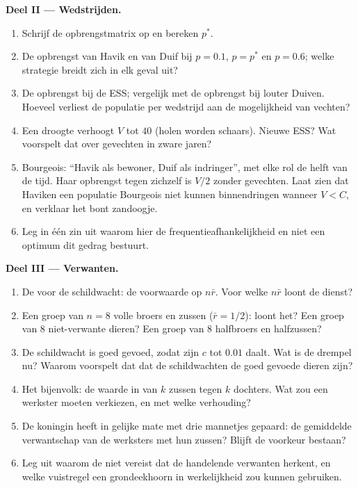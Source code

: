 \begin{problem}
\medskip
\noindent\textbf{Deel II --- Wedstrijden.}
\begin{enumerate}[resume]
  \item Schrijf de opbrengstmatrix op en bereken $p^{*}$.
  \item De opbrengst van Havik en van Duif bij $p = 0.1$, $p = p^{*}$ en $p =
        0.6$; welke strategie breidt zich in elk geval uit?
  \item De opbrengst bij de ESS; vergelijk met de opbrengst bij louter
        Duiven. Hoeveel verliest de populatie per wedstrijd aan de
        mogelijkheid van vechten?
  \item Een droogte verhoogt $V$ tot $40$ (holen worden schaars). Nieuwe
        ESS? Wat voorspelt dat over gevechten in zware jaren?
  \item Bourgeois: ``Havik als bewoner, Duif als indringer'', met elke
        rol de helft van de tijd. Haar opbrengst tegen zichzelf is $V/2$
        zonder gevechten. Laat zien dat Haviken een populatie Bourgeois
        niet kunnen binnendringen wanneer $V
        < C$, en verklaar het bont zandoogje.
  \item Leg in één zin uit waarom hier de frequentieafhankelijkheid en
        niet een optimum dit gedrag bestuurt.
\end{enumerate}

\medskip
\noindent\textbf{Deel III --- Verwanten.}
\begin{enumerate}[resume]
  \item De  voor de schildwacht: de voorwaarde op
        $n\bar r$. Voor welke $n\bar r$ loont de dienst?
  \item Een groep van $n = 8$ volle broers en zussen ($\bar r = 1/2$):
        loont het? Een groep van 8 niet-verwante dieren? Een groep van 8
        halfbroers en halfzussen?
  \item De schildwacht is goed gevoed, zodat zijn $c$ tot $0.01$ daalt.
        Wat is de drempel nu? Waarom voorspelt dat dat de schildwachten
        de goed gevoede dieren zijn?
  \item Het bijenvolk: de waarde in  van $k$ zussen
        tegen $k$ dochters. Wat zou een werkster moeten verkiezen, en
        met welke verhouding?
  \item De koningin heeft in gelijke mate met drie mannetjes gepaard:
        de gemiddelde verwantschap van de werksters met hun zussen?
        Blijft de voorkeur bestaan?
  \item Leg uit waarom de  niet vereist dat de
        handelende verwanten herkent, en welke vuistregel een
        grondeekhoorn in werkelijkheid zou kunnen gebruiken.
\end{enumerate}


\end{problem}
